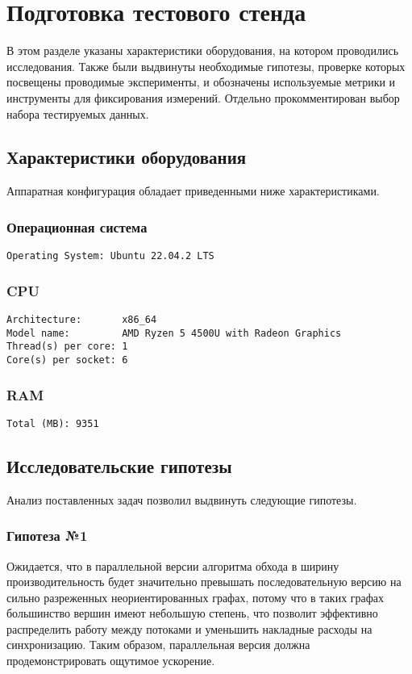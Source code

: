 
\section{Подготовка тестового стенда}
\noindent В этом разделе указаны характеристики оборудования, на котором проводились исследования. Также были выдвинуты необходимые гипотезы, проверке которых посвещены проводимые эксперименты, и обозначены используемые метрики и инструменты для фиксирования измерений. Отдельно прокомментирован выбор набора тестируемых данных.



\subsection{Характеристики оборудования}
\noindent Аппаратная конфигурация обладает приведенными ниже характеристиками.
\subsubsection*{Операционная система}

\begin{verbatim}
Operating System: Ubuntu 22.04.2 LTS
\end{verbatim}

\subsubsection*{CPU}
\begin{verbatim}
Architecture:       x86_64
Model name:         AMD Ryzen 5 4500U with Radeon Graphics
Thread(s) per core: 1
Core(s) per socket: 6
\end{verbatim}

\subsubsection*{RAM}
\begin{verbatim}
Total (MB): 9351
\end{verbatim}



\subsection{Исследовательские гипотезы}
\noindent Анализ поставленных задач позволил выдвинуть следующие гипотезы.

\subsubsection*{Гипотеза №1}
\label{t1}
\noindent Ожидается, что в параллельной версии алгоритма обхода в ширину производительность будет значительно превышать последовательную версию на сильно разреженных неориентированных графах, потому что в таких графах большинство вершин имеют небольшую степень, что позволит эффективно распределить работу между потоками и уменьшить накладные расходы на синхронизацию. Таким образом, параллельная версия должна продемонстрировать ощутимое ускорение.


